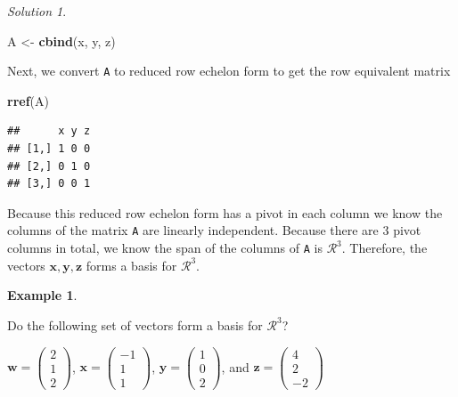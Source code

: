 \documentclass[
]{book}
\newenvironment{Shaded}{\begin{snugshade}}{\end{snugshade}}
\newcommand{\KeywordTok}[1]{\textcolor[rgb]{0.13,0.29,0.53}{\textbf{#1}}}
\newcommand{\NormalTok}[1]{#1}
\newcommand{\StringTok}[1]{\textcolor[rgb]{0.31,0.60,0.02}{#1}}
\theoremstyle{definition}
\theoremstyle{definition}
\newtheorem{example}{Example}[chapter]
\theoremstyle{definition}
\theoremstyle{remark}
\newtheorem*{solution}{Solution}
\begin{document}
\begin{solution}
\begin{Shaded}
\begin{Highlighting}[]
\NormalTok{A <-}\StringTok{ }\KeywordTok{cbind}\NormalTok{(x, y, z)}
\end{Highlighting}
\end{Shaded}

Next, we convert \texttt{A} to reduced row echelon form to get the row equivalent matrix

\begin{Shaded}
\begin{Highlighting}[]
\KeywordTok{rref}\NormalTok{(A)}
\end{Highlighting}
\end{Shaded}

\begin{verbatim}
##      x y z
## [1,] 1 0 0
## [2,] 0 1 0
## [3,] 0 0 1
\end{verbatim}

Because this reduced row echelon form has a pivot in each column we know the columns of the matrix \texttt{A} are linearly independent. Because there are 3 pivot columns in total, we know the span of the columns of \texttt{A} is \(\mathcal{R}^3\). Therefore, the vectors \(\mathbf{x}, \mathbf{y}, \mathbf{z}\) forms a basis for \(\mathcal{R}^3\).

\end{solution}

\begin{example}
\protect\hypertarget{exm:unlabeled-div-89}{}\label{exm:unlabeled-div-89}

Do the following set of vectors form a basis for \(\mathcal{R}^3\)?

\(\mathbf{w} = \begin{pmatrix} 2 \\ 1 \\ 2 \end{pmatrix}\), \(\mathbf{x} = \begin{pmatrix} -1 \\ 1 \\ 1 \end{pmatrix}\), \(\mathbf{y} = \begin{pmatrix} 1 \\ 0 \\ 2 \end{pmatrix}\), and \(\mathbf{z} = \begin{pmatrix} 4 \\ 2 \\ -2 \end{pmatrix}\)

\end{example}
\end{document}
